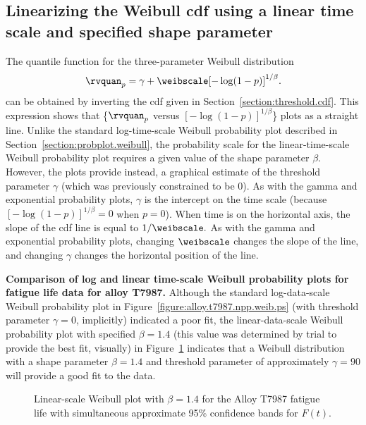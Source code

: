 \subsection{Linearizing the Weibull cdf using a linear time scale and
specified shape parameter}
\label{section:probplot.linear.weibull}
The quantile
function for the three-parameter Weibull distribution
\begin{displaymath}
\rvquan_{p}=	 \gamma + \weibscale[-\log(1-p)]^{1/\beta}.
\end{displaymath} 
can be obtained by inverting the cdf given in
Section~\ref{section:threshold.cdf}.  This expression shows that
\{$\rvquan_{p}$ versus $[-\log(1-p)]^{1/\beta}$\} plots as a
straight line.  Unlike the standard log-time-scale Weibull
probability plot described in
Section~\ref{section:probplot.weibull}, the probability scale for
the linear-time-scale Weibull probability plot requires a given
value of the shape parameter $\beta$. However, the plots provide
instead, a graphical estimate of the threshold parameter $\gamma$
(which was previously constrained to be 0). As with the gamma and
exponential probability plots, $\gamma$ is the intercept on the time
scale (because $[-\log(1-p)]^{1/\beta}=0$ when $p=0$).  When time is
on the horizontal axis, the slope of the cdf line is equal to
$1/\weibscale.$ As with the gamma and exponential probability plots,
changing $\weibscale$ changes the slope of the line, and changing
$\gamma$ changes the horizontal position of the line.

\begin{example} 
\label{example:alloy.t7987.weibull.plot.compare}
{\bf Comparison of log and linear time-scale Weibull
probability plots for fatigue life data for alloy T7987.} 
Although the standard log-data-scale Weibull probability plot in
Figure~\ref{figure:alloy.t7987.npp.weib.ps} (with threshold parameter
$\gamma=0$, implicitly) indicated a poor fit, the linear-data-scale
Weibull probability plot with specified $\beta=1.4$ (this value was
determined by trial to provide the best fit, visually) in
Figure~\ref{figure:alloy.t7987.npp.weib.1p4.ps} indicates that a
Weibull distribution with a shape parameter $\beta=1.4$ and threshold
parameter of approximately $\gamma=90$ will provide a good fit to the
data.
\begin{figure}
\caption{Linear-scale Weibull plot with $\beta=1.4$
for the Alloy T7987 fatigue life with
simultaneous approximate 95\% confidence bands for $F(t)$.}
\label{figure:alloy.t7987.npp.weib.1p4.ps}
\end{figure}
\end{example}


